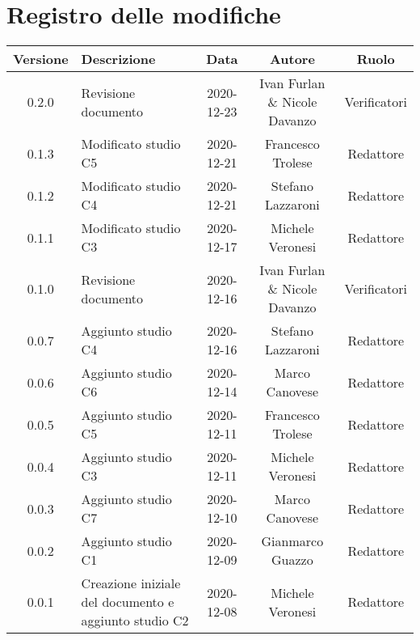 \section*{Registro delle modifiche}

\begin{center}
	\begin{longtable}{|c|p{5cm}|c|c|c|}
	\hline
	\rowcolor{lighter-grayer}
	\textbf{Versione} & \textbf{Descrizione} & \textbf{Data} & \textbf{Autore} & \textbf{Ruolo} \\
	\hline
	\endfirsthead

	\hline
	0.2.0 & Revisione documento & 2020-12-23 & Ivan Furlan \& Nicole Davanzo & Verificatori \\ 
	0.1.3 & Modificato studio C5 & 2020-12-21 & Francesco Trolese & Redattore \\
	0.1.2 & Modificato studio C4 & 2020-12-21 & Stefano Lazzaroni & Redattore \\
	0.1.1 & Modificato studio C3 & 2020-12-17 & Michele Veronesi & Redattore \\
	0.1.0 & Revisione documento & 2020-12-16 & Ivan Furlan \& Nicole Davanzo & Verificatori \\
	0.0.7 & Aggiunto studio C4 & 2020-12-16 & Stefano Lazzaroni & Redattore \\
	0.0.6 & Aggiunto studio C6 & 2020-12-14 & Marco Canovese & Redattore \\
	0.0.5 & Aggiunto studio C5 & 2020-12-11 & Francesco Trolese & Redattore \\
	0.0.4 & Aggiunto studio C3 & 2020-12-11 & Michele Veronesi & Redattore \\
	0.0.3 & Aggiunto studio C7 & 2020-12-10 & Marco Canovese & Redattore \\
	0.0.2 & Aggiunto studio C1 & 2020-12-09 & Gianmarco Guazzo & Redattore\\
    0.0.1 & Creazione iniziale del documento e aggiunto studio C2 & 2020-12-08 & Michele Veronesi & Redattore\\
	\hline

	\end{longtable}
\end{center}